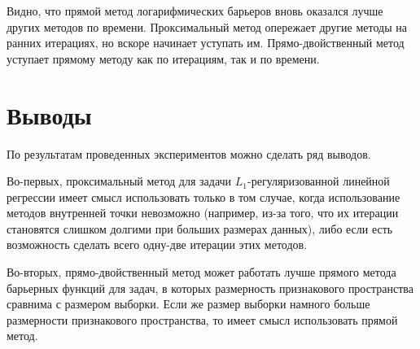 \documentclass[12pt]{article}
\begin{document}
	Видно, что прямой метод логарифмических барьеров вновь оказался лучше других методов по времени. Проксимальный метод опережает другие методы на ранних итерациях, но вскоре начинает уступать им. Прямо-двойственный метод уступает прямому методу как по итерациям, так и по времени.
	
\section{Выводы}

	По результатам проведенных экспериментов можно сделать ряд выводов. 
	
	Во-первых, проксимальный метод для задачи $L_1$-регуляризованной линейной регрессии имеет смысл использовать только в том случае, когда использование методов внутренней точки невозможно (например, из-за того, что их итерации становятся слишком долгими при больших размерах данных), либо если есть возможность сделать всего одну-две итерации этих методов.
	
	Во-вторых, прямо-двойственный метод может работать лучше прямого метода барьерных функций для задач, в которых размерность признакового пространства сравнима с размером выборки. Если же размер выборки намного больше размерности признакового пространства, то имеет смысл использовать прямой метод. 
	
	
\end{document}
